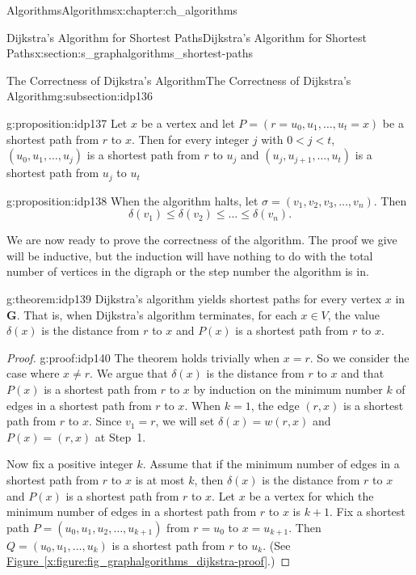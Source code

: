 \documentclass[oneside,10pt,]{book}
\newcommand{\xreffont}{\relax}
\numberwithin{equation}{section}
\newcommand{\bfG}{\mathbf{G}}
\newcommand{\lt}{<}
\begin{document}
\begin{chapterptx}{Algorithms}{}{Algorithms}{}{}{x:chapter:ch_algorithms}
\begin{sectionptx}{Dijkstra's Algorithm for Shortest Paths}{}{Dijkstra's Algorithm for Shortest Paths}{}{}{x:section:s_graphalgorithms_shortest-paths}
\begin{subsectionptx}{The Correctness of Dijkstra's Algorithm}{}{The Correctness of Dijkstra's Algorithm}{}{}{g:subsection:idp136}
\begin{proposition}{}{}{g:proposition:idp137}%
Let \(x\) be a vertex and let \(P=(r=u_0,u_1,\dots,u_t=x)\) be a shortest path from \(r\) to \(x\). Then for every integer \(j\) with \(0\lt j\lt t\), \((u_0,u_1,\dots,u_j)\) is a shortest path from \(r\) to \(u_j\) and \((u_j,u_{j+1},\dots,u_t)\) is a shortest path from \(u_j\) to \(u_t\)%
\end{proposition}
\begin{proposition}{}{}{g:proposition:idp138}%
When the algorithm halts, let \(\sigma=(v_1,v_2,v_3,\dots,v_n)\).  Then%
\begin{equation*}
\delta(v_1)\le \delta(v_2)\le\dots \le \delta(v_n).
\end{equation*}
%
\end{proposition}
We are now ready to prove the correctness of the algorithm. The proof we give will be inductive, but the induction will have nothing to do with the total number of vertices in the digraph or the step number the algorithm is in.%
\begin{theorem}{}{}{g:theorem:idp139}%
Dijkstra's algorithm yields shortest paths for every vertex \(x\) in \(\bfG\). That is, when Dijkstra's algorithm terminates, for each \(x\in V\), the value \(\delta(x)\) is the distance from \(r\) to \(x\) and \(P(x)\) is a shortest path from \(r\) to \(x\).%
\end{theorem}
\begin{proof}{}{g:proof:idp140}
The theorem holds trivially when \(x=r\). So we consider the case where \(x\neq r\). We argue that \(\delta(x)\) is the distance from \(r\) to \(x\) and that \(P(x)\) is a shortest path from \(r\) to \(x\) by induction on the minimum number \(k\) of edges in a shortest path from \(r\) to \(x\). When \(k=1\), the edge \((r,x)\) is a shortest path from \(r\) to \(x\). Since \(v_1=r\), we will set \(\delta(x)=w(r,x)\) and \(P(x)=(r,x)\) at Step~1.%
\par
Now fix a positive integer \(k\). Assume that if the minimum number of edges in a shortest path from \(r\) to \(x\) is at most \(k\), then \(\delta(x)\) is the distance from \(r\) to \(x\) and \(P(x)\) is a shortest path from \(r\) to \(x\). Let \(x\) be a vertex for which the minimum number of edges in a shortest path from \(r\) to \(x\) is \(k+1\). Fix a shortest path \(P=(u_0,u_1,u_2,\dots,u_{k+1})\) from \(r=u_0\) to \(x=u_{k+1}\). Then \(Q=(u_0,u_1,\dots,u_k)\) is a shortest path from \(r\) to \(u_k\). (See \hyperref[x:figure:fig_graphalgorithms_dijkstra-proof]{Figure~{\xreffont\ref{x:figure:fig_graphalgorithms_dijkstra-proof}}}.)%

\end{proof}
\end{subsectionptx}
\end{sectionptx}
\end{chapterptx}
\end{document}

